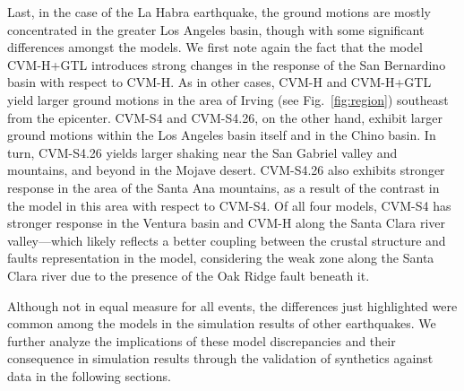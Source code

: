 Last, in the case of the La Habra earthquake, the ground motions are mostly concentrated in the greater Los Angeles basin, though with some significant differences amongst the models. We first note again the fact that the model CVM-H+GTL introduces strong changes in the response of the San Bernardino basin with respect to CVM-H. As in other cases, CVM-H and CVM-H+GTL yield larger ground motions in the area of Irving (see Fig.~\ref{fig:region}) southeast from the epicenter. CVM-S4 and CVM-S4.26, on the other hand, exhibit larger ground motions within the Los Angeles basin itself and in the Chino basin. In turn, CVM-S4.26 yields larger shaking near the San Gabriel valley and mountains, and beyond in the Mojave desert. CVM-S4.26 also exhibits stronger response in the area of the Santa Ana mountains, as a result of the contrast in the model in this area with respect to CVM-S4. Of all four models, CVM-S4 has stronger response in the Ventura basin and CVM-H along the Santa Clara river valley---which likely reflects a better coupling between the crustal structure and faults representation in the model, considering the weak zone along the Santa Clara river due to the presence of the Oak Ridge fault beneath it.

Although not in equal measure for all events, the differences just highlighted were common among the models in the simulation results of other earthquakes. We further analyze the implications of these model discrepancies and their consequence in simulation results through the validation of synthetics against data in the following sections.


